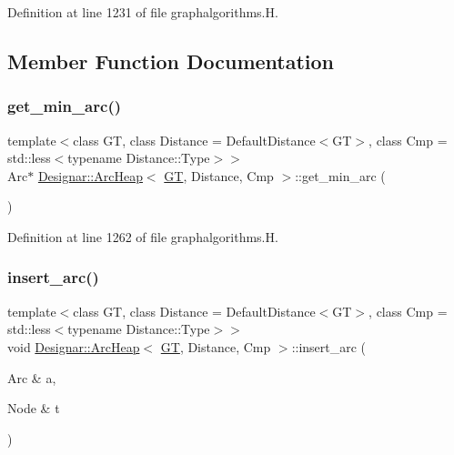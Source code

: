 Definition at line 1231 of file graphalgorithms.\+H.



\subsection{Member Function Documentation}
\mbox{\label{class_designar_1_1_arc_heap_aa97981f64e6a7868d4d8b310bfd6b1cb}} 
\subsubsection{\texorpdfstring{get\+\_\+min\+\_\+arc()}{get\_min\_arc()}}
{\footnotesize\ttfamily template$<$class GT, class Distance = Default\+Distance$<$\+G\+T$>$, class Cmp = std\+::less$<$typename Distance\+::\+Type$>$$>$ \\
Arc$\ast$ \hyperlink{class_designar_1_1_arc_heap}{Designar\+::\+Arc\+Heap}$<$ \hyperlink{demo-buildgraph_8_c_a3001c40d2c31ca87ed96cd7d1334a55e}{GT}, Distance, Cmp $>$\+::get\+\_\+min\+\_\+arc (\begin{DoxyParamCaption}{ }\end{DoxyParamCaption})\hspace{0.3cm}{\ttfamily [inline]}}



Definition at line 1262 of file graphalgorithms.\+H.

\mbox{\label{class_designar_1_1_arc_heap_a578a5310c000e671cb967799317f534d}} 
\subsubsection{\texorpdfstring{insert\+\_\+arc()}{insert\_arc()}}
{\footnotesize\ttfamily template$<$class GT, class Distance = Default\+Distance$<$\+G\+T$>$, class Cmp = std\+::less$<$typename Distance\+::\+Type$>$$>$ \\
void \hyperlink{class_designar_1_1_arc_heap}{Designar\+::\+Arc\+Heap}$<$ \hyperlink{demo-buildgraph_8_c_a3001c40d2c31ca87ed96cd7d1334a55e}{GT}, Distance, Cmp $>$\+::insert\+\_\+arc (\begin{DoxyParamCaption}\item[{Arc \&}]{a,  }\item[{Node \&}]{t }\end{DoxyParamCaption})\hspace{0.3cm}{\ttfamily [inline]}}



